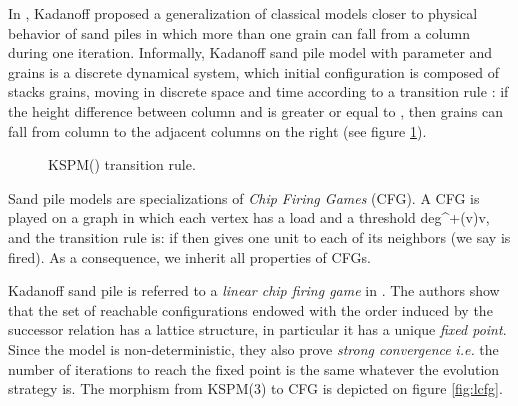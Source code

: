 \documentclass[11pt,a4paper]{llncs}
\begin{document}
  In \cite{kadanoff89}, Kadanoff proposed a generalization of classical models closer to physical behavior of sand piles in which more than one grain can fall from a column during one iteration. Informally, Kadanoff sand pile model with parameter  and  grains is a discrete dynamical system, which initial configuration is composed of  stacks grains, moving in discrete space and time according to a transition rule : if the height difference between column  and  is greater or equal to , then  grains can fall from column  to the  adjacent columns on the right (see figure \ref{fig:rule}).

\begin{figure}[!h]
  \begin{center}
       \end{center}
  \caption{KSPM() transition rule.}
  \label{fig:rule}
\end{figure}


Sand pile models are specializations of {\em Chip Firing Games} (CFG). A CFG is played on a graph in which each vertex  has a load  and a threshold deg^+(v)v, and the transition rule is: if  then  gives one unit to each of its neighbors (we say  is fired). As a consequence, we inherit all  properties of CFGs. 

Kadanoff sand pile is referred to a {\em linear chip firing game} in \cite{goles02}. The authors show that the set of reachable configurations endowed with the order induced by the successor relation has a lattice structure, in particular it has a unique {\em fixed point}. Since the model is non-deterministic, they also prove \emph{strong convergence} {\em i.e.} the number of iterations to reach the fixed point is the same whatever the evolution strategy is. The morphism from KSPM(3) to CFG is depicted on figure \ref{fig:lcfg}.
\end{document}
